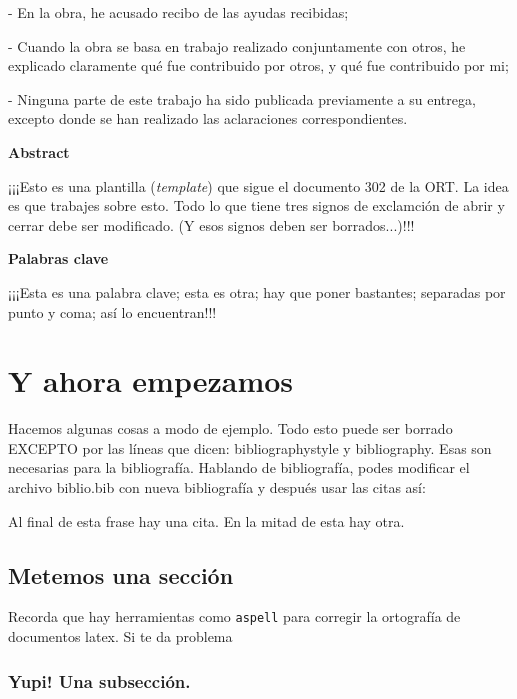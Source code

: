 \documentclass[12pt,a4paper,oneside]{book}
\begin{document}
- En la obra, he acusado recibo de las ayudas recibidas;

- Cuando la obra se basa en trabajo realizado conjuntamente con otros, he explicado claramente qué fue contribuido por otros, y qué fue contribuido por mi;

- Ninguna parte de este trabajo ha sido publicada previamente a su entrega, excepto donde se han realizado las aclaraciones correspondientes.
\bigskip\bigskip

\vspace*{\fill}


\newpage 

{\huge\bfseries \space Abstract}
\bigskip
\bigskip

¡¡¡Esto es una plantilla ({\it template}) que sigue el documento 302 de la ORT. La idea es que trabajes sobre esto. Todo lo que tiene tres signos de exclamción de abrir y cerrar debe ser modificado. (Y esos signos deben ser borrados...)!!!

\newpage

{\huge\bfseries \space Palabras clave}
\bigskip
\bigskip

¡¡¡Esta es una palabra clave; esta es otra; hay que poner bastantes; separadas por punto y coma; así lo encuentran!!!

\newpage

\tableofcontents

\chapter{Y ahora empezamos}

Hacemos algunas cosas a modo de ejemplo. Todo esto puede ser borrado EXCEPTO por las líneas 
que dicen: bibliographystyle y bibliography. Esas son necesarias para la bibliografía. Hablando de bibliografía, podes modificar el archivo biblio.bib con nueva bibliografía y después usar las citas así:


Al final de esta frase hay una cita.\cite{citalibro}
En la mitad\cite{citaarticulo} de esta hay otra.


\section{Metemos una sección}

Recorda que hay herramientas como {\tt aspell} para corregir la ortografía de documentos latex.
Si te da problema 


\subsection{Yupi! Una subsección.}
\end{document}
